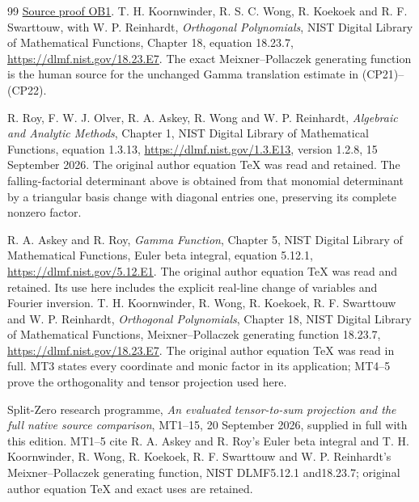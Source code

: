 \documentclass[11pt]{article}
\begin{document}
\begin{thebibliography}{99}
\href{https://github.com/KokunoYumeto/zeta-function-research-reader/blob/487253b5b01851da5b9b98af4e146fecf1fab902/workbenches/splitzero-tandem/continuations/20260920-heat-literature-observed-class/HEAT_LITERATURE_AND_OBSERVED_CLASS.tex\#L1223}{Source proof OB1}.
 T. H. Koornwinder, R. S. C. Wong, R. Koekoek and
R. F. Swarttouw, with W. P. Reinhardt, \emph{Orthogonal Polynomials},
NIST Digital Library of Mathematical Functions, Chapter 18,
equation 18.23.7, \url{https://dlmf.nist.gov/18.23.E7}.
The exact Meixner--Pollaczek generating function is the human source
for the unchanged Gamma translation estimate in (CP21)--(CP22).


 R. Roy, F. W. J. Olver, R. A. Askey,
R. Wong and W. P. Reinhardt, \emph{Algebraic and Analytic Methods},
Chapter 1, NIST Digital Library of Mathematical Functions,
equation 1.3.13, \url{https://dlmf.nist.gov/1.3.E13},
version 1.2.8, 15 September 2026. The original author equation TeX
was read and retained. The falling-factorial determinant above is
obtained from that monomial determinant by a triangular basis change
with diagonal entries one, preserving its complete nonzero factor.


 R. A. Askey and R. Roy, \emph{Gamma Function}, Chapter 5,
NIST Digital Library of Mathematical Functions, Euler beta integral,
equation 5.12.1, \url{https://dlmf.nist.gov/5.12.E1}.
The original author equation TeX was read and retained. Its use here
includes the explicit real-line change of variables and Fourier inversion.
 T. H. Koornwinder, R. Wong, R. Koekoek, R. F. Swarttouw
and W. P. Reinhardt, \emph{Orthogonal Polynomials}, Chapter 18,
NIST Digital Library of Mathematical Functions, Meixner--Pollaczek
generating function 18.23.7, \url{https://dlmf.nist.gov/18.23.E7}.
The original author equation TeX was read in full. MT3 states every
coordinate and monic factor in its application; MT4--5 prove the
orthogonality and tensor projection used here.


 Split-Zero research programme, \emph{An evaluated tensor-to-sum
projection and the full native source comparison}, MT1--15,
20 September 2026, supplied in full with this edition. MT1--5 cite
R. A. Askey and R. Roy's Euler beta integral and T. H. Koornwinder,
R. Wong, R. Koekoek, R. F. Swarttouw and W. P. Reinhardt's
Meixner--Pollaczek generating function, NIST DLMF5.12.1 and18.23.7;
original author equation TeX and exact uses are retained.


\end{thebibliography}
\end{document}
